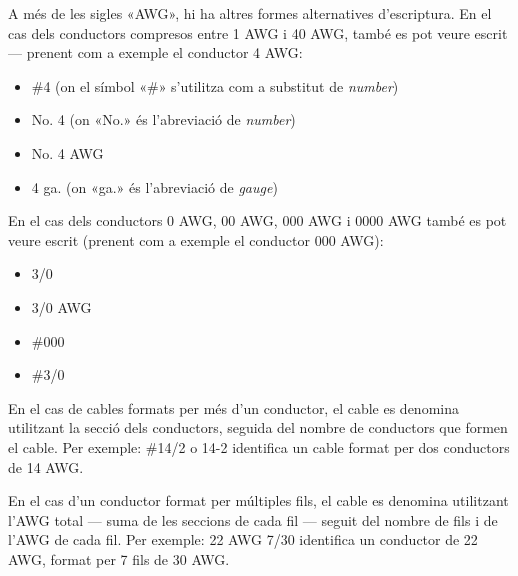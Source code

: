 A més de les sigles «AWG», hi ha altres formes alternatives d'escriptura. En el cas dels conductors compresos entre 1 AWG i 40 AWG, també es pot veure escrit --- prenent com a exemple el conductor 4 AWG:
\begin{itemize}
   \item \#4 (on el símbol «\#» s'utilitza com a substitut de \textit{number})
   \item No. 4 (on «No.» és l'abreviació de \textit{number})
   \item No. 4 AWG
   \item 4 ga. (on «ga.» és l'abreviació de \textit{gauge})
\end{itemize}

En el cas dels conductors 0 AWG, 00 AWG, 000 AWG i 0000 AWG també es pot veure escrit (prenent com a exemple el conductor 000 AWG):
\begin{itemize}
   \item 3/0
   \item 3/0 AWG
   \item \#000
   \item \#3/0
\end{itemize}


En el cas de cables formats per més d'un conductor, el cable es denomina utilitzant la secció dels conductors, seguida del nombre de conductors que formen el cable. Per exemple: \#14/2 o 14-2 identifica un cable format per dos conductors de 14 AWG.

En el cas d'un conductor format per múltiples fils, el cable es denomina utilitzant l'AWG total --- suma de les seccions de cada fil --- seguit del nombre de fils i de l'AWG de cada fil. Per exemple: 22 AWG 7/30 identifica un conductor de 22 AWG, format per 7 fils de  30 AWG.

